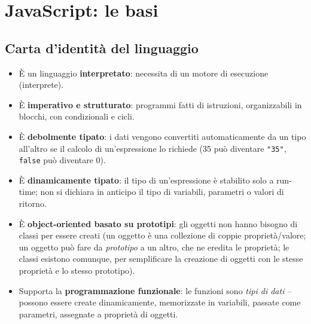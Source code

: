 \chapter{JavaScript: le basi}

\section{Carta d'identit\`a del linguaggio}

\begin{definizione}
\begin{itemize}
  \item \`E un linguaggio \textbf{interpretato}: necessita di un motore di esecuzione
        (interprete).
  \item \`E \textbf{imperativo e strutturato}: programmi fatti di istruzioni, organizzabili
        in blocchi, con condizionali e cicli.
  \item \`E \textbf{debolmente tipato}: i dati vengono convertiti automaticamente da un tipo
        all'altro se il calcolo di un'espressione lo richiede (35 pu\`o diventare
        \texttt{"35"}, \texttt{false} pu\`o diventare 0).
  \item \`E \textbf{dinamicamente tipato}: il tipo di un'espressione \`e stabilito solo a
        run-time; non si dichiara in anticipo il tipo di variabili, parametri o valori di
        ritorno.
  \item \`E \textbf{object-oriented basato su prototipi}: gli oggetti non hanno bisogno di
        classi per essere creati (un oggetto \`e una collezione di coppie propriet\`a/valore;
        un oggetto pu\`o fare da \emph{prototipo} a un altro, che ne eredita le propriet\`a;
        le classi esistono comunque, per semplificare la creazione di oggetti con le stesse
        propriet\`a e lo stesso prototipo).
  \item Supporta la \textbf{programmazione funzionale}: le funzioni sono \emph{tipi di dati}
        -- possono essere create dinamicamente, memorizzate in variabili, passate come
        parametri, assegnate a propriet\`a di oggetti.
\end{itemize}
\end{definizione}

